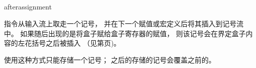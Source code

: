 \documentclass{book}
\begin{document}
\subsection{\protect{}}
\label{sec:afterassignment}

\csterm afterassignment\par 指令从输入流上取走一个记号，
并在下一个赋值或宏定义后将其插入到记号流中。
如果随后出现的是将盒子赋给盒子寄存器的赋值，
则该记号会在界定盒子内容的左花括号之后被插入
（见第\pageref{every:box:assign}页)。

使用这种方式只能存储一个记号；
之后的存储的记号会覆盖之前的。
\end{document}
